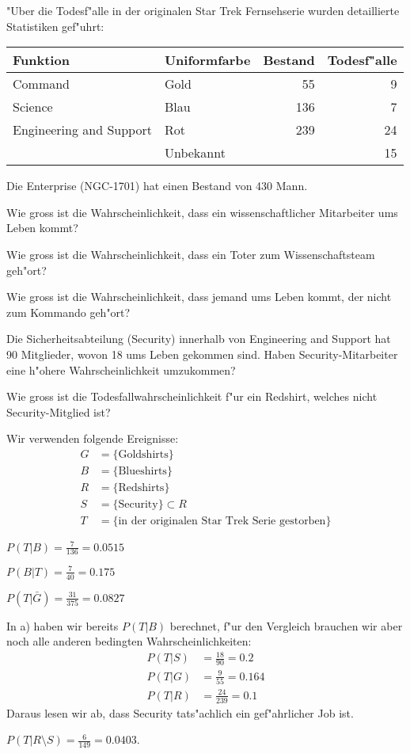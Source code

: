 "Uber die Todesf"alle in der originalen Star Trek Fernsehserie wurden
detaillierte Statistiken gef"uhrt:
\begin{center}
\begin{tabular}{|l|l|r|r|}
\hline
Funktion&Uniformfarbe&Bestand&Todesf"alle\\
\hline
Command&Gold&55&9\\
Science&Blau&136&7\\
Engineering and Support&Rot&239&24\\
&Unbekannt&&15\\
\hline
\end{tabular}
\end{center}
Die Enterprise (NGC-1701) hat einen Bestand von 430 Mann.
\begin{teilaufgaben}
\item
Wie gross ist die Wahrscheinlichkeit, dass ein wissenschaftlicher Mitarbeiter
ums Leben kommt?
\item
Wie gross ist die Wahrscheinlichkeit, dass ein Toter zum Wissenschaftsteam
geh"ort?
\item
Wie gross ist die Wahrscheinlichkeit, dass jemand ums Leben kommt, der
nicht zum Kommando geh"ort?
\item 
Die Sicherheitsabteilung (Security) innerhalb von Engineering and Support
hat 90 Mitglieder, wovon 18 ums Leben gekommen sind.
Haben Security-Mitarbeiter eine h"ohere Wahrscheinlichkeit umzukommen?
\item
Wie gross ist die Todesfallwahrscheinlichkeit f"ur ein Redshirt, welches
nicht Security-Mitglied ist?
\end{teilaufgaben}

\begin{loesung}
Wir verwenden folgende Ereignisse:
\begin{align*}
G&=\{\text{Goldshirts}\}\\
B&=\{\text{Blueshirts}\}\\
R&=\{\text{Redshirts}\}\\
S&=\{\text{Security}\}\subset R\\
T&=\{\text{in der originalen Star Trek Serie gestorben}\}
\end{align*}
\begin{teilaufgaben}
\item
$
P(T|B)=\frac{7}{136}=0.0515
$
\item
$
P(B|T)=\frac{7}{40}=0.175
$
\item
$
P(T|\bar G)=\frac{31}{375}=0.0827
$
\item
In a) haben wir bereits $P(T|B)$ berechnet, f"ur den Vergleich
brauchen wir aber noch alle anderen bedingten Wahrscheinlichkeiten:
\begin{align*}
P(T|S)&=\frac{18}{90}=0.2
\\
P(T|G)&=\frac{9}{55}=0.164
\\
P(T|R)&=\frac{24}{239}=0.1
\end{align*}
Daraus lesen wir ab, dass Security tats"achlich ein gef"ahrlicher
Job ist.
\item
$P(T|R\setminus S)=\frac{6}{149}=0.0403$.
\end{teilaufgaben}
\end{loesung}

